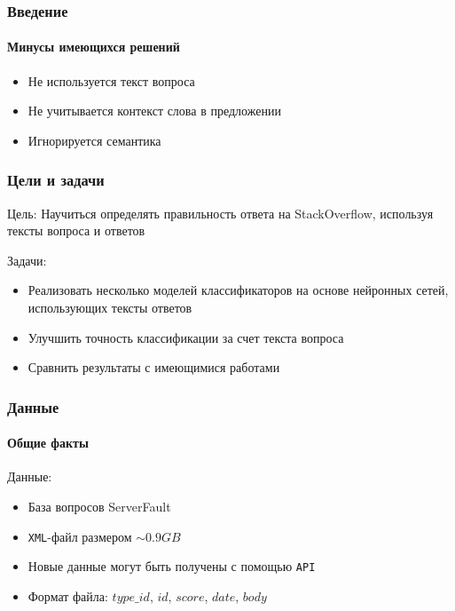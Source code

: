 \documentclass[10pt]{beamer}
\begin{document}

\begin{frame}
\frametitle{Введение}
\framesubtitle{Минусы имеющихся решений}

\begin{itemize}
	\setlength{\itemsep}{1em}
	\item Не используется текст вопроса
	\item Не учитывается контекст слова в предложении
	\item Игнорируется семантика
\end{itemize}

\end{frame}



\begin{frame}
\frametitle{Цели и задачи}

Цель: Научиться определять правильность ответа на StackOverflow, используя тексты вопроса и ответов

\medskip

Задачи:
\begin{itemize}
	\item Реализовать несколько моделей классификаторов на основе нейронных сетей, использующих тексты ответов
	\item Улучшить точность классификации за счет текста вопроса
	\item Сравнить результаты с имеющимися работами
\end{itemize}


\end{frame}


\begin{frame}
\frametitle{Данные}
\framesubtitle{Общие факты}

Данные:

\begin{itemize}
	\item База вопросов ServerFault
	\item \texttt{XML}-файл размером $\sim0.9GB$
	\item Новые данные могут быть получены с помощью \texttt{API}
	\item Формат файла: $type\_id$, $id$, $score$, $date$, $body$
\end{itemize}

\end{frame}
\end{document}
